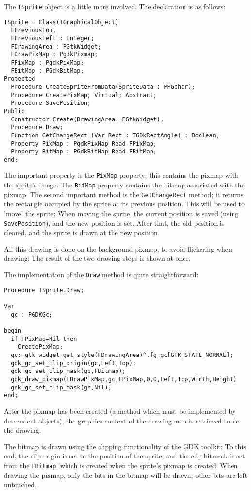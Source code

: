 \documentclass[10pt]{article}
\newcommand{\var}[1]{\texttt{#1}}
\begin{document}
The \var{TSprite} object is a little more involved. The declaration is 
as follows:
\begin{verbatim}
TSprite = Class(TGraphicalObject)
  FPreviousTop,
  FPreviousLeft : Integer;
  FDrawingArea : PGtkWidget;
  FDrawPixMap : PgdkPixmap;
  FPixMap : PgdkPixMap;
  FBitMap : PGdkBitMap;
Protected
  Procedure CreateSpriteFromData(SpriteData : PPGchar);
  Procedure CreatePixMap; Virtual; Abstract; 
  Procedure SavePosition;
Public
  Constructor Create(DrawingArea: PGtkWidget);
  Procedure Draw;    
  Function GetChangeRect (Var Rect : TGDkRectAngle) : Boolean;
  Property PixMap : PgdkPixMap Read FPixMap;
  Property BitMap : PGdkBitMap Read FBitMap; 
end;
\end{verbatim}
The important property is the \var{PixMap} property; this contains the
pixmap with the sprite's image. The \var{BitMap} property contains the
bitmap associated with the pixmap. The second important method is the
\var{GetChangeRect} method; it returns the rectangle occupied by the
sprite at its previous position. This will be used to 'move' the sprite:
When moving the sprite, the current position is saved (using
\var{SavePosition}), and the new position is set. After that, the old 
position is cleared, and the sprite is drawn at the new position. 

All this drawing is done on the background pixmap, to avoid flickering 
when drawing: The result of the two drawing steps is shown at once.

The implementation of the \var{Draw} method is quite straightforward:
\begin{verbatim}
Procedure TSprite.Draw;    

Var
  gc : PGDKGc;
  
begin
  if FPixMap=Nil then
    CreatePixMap;    
  gc:=gtk_widget_get_style(FDrawingArea)^.fg_gc[GTK_STATE_NORMAL];
  gdk_gc_set_clip_origin(gc,Left,Top);
  gdk_gc_set_clip_mask(gc,FBitmap);
  gdk_draw_pixmap(FDrawPixMap,gc,FPixMap,0,0,Left,Top,Width,Height)
  gdk_gc_set_clip_mask(gc,Nil);  
end;
\end{verbatim}
After the pixmap has been created (a method which must be implemented by
descendent objects), the graphics context of the drawing area is retrieved 
to do the drawing.

The bitmap is drawn using the clipping functionality of the GDK toolkit:
To this end, the clip origin is set to the position of the sprite, and
the clip bitmask is set from the \var{FBitmap}, which is created when the
sprite's pixmap is created. When drawing the pixmap, only the bits in the
bitmap will be drawn, other bits are left untouched.
\end{document}
